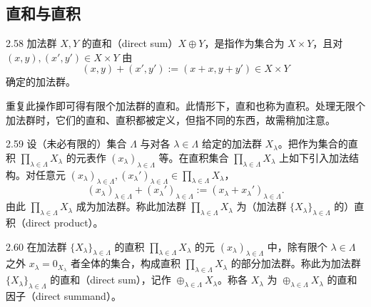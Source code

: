 
\subsection{直和与直积}

\begin{definition}{2.58} 加法群 $X,Y$ 的直和（direct sum）$X\oplus Y$，是指作为集合为 $X\times Y$，且对 $(x,y),(x',y')\in X\times Y$ 由
\[
  (x,y)+(x',y'):=(x+x,y+y')\in X\times Y
\]
确定的加法群。\end{definition}


重复此操作即可得有限个加法群的直和。此情形下，直和也称为直积。处理无限个加法群时，它们的直和、直积都被定义，但指不同的东西，故需稍加注意。

\begin{definition}{2.59} 设（未必有限的）集合 $\Lambda$ 与对各 $\lambda\in\Lambda$ 给定的加法群 $X_\lambda$。把作为集合的直积 $\prod_{\lambda\in\Lambda}X_\lambda$ 的元表作 $(x_\lambda)_{\lambda\in\Lambda}$ 等。在直积集合 $\prod_{\lambda\in\Lambda}X_\lambda$ 上如下引入加法结构。对任意元 $(x_\lambda)_{\lambda\in\Lambda},(x_\lambda')_{\lambda\in\Lambda}\in\prod_{\lambda\in\Lambda}X_\lambda$，
\begin{equation}
  (x_\lambda)_{\lambda\in\Lambda}+(x_\lambda')_{\lambda\in\Lambda}:=(x_\lambda+x_\lambda')_{\lambda\in\Lambda}. \tag{2.7}
\end{equation}
由此 $\prod_{\lambda\in\Lambda}X_\lambda$ 成为加法群。称此加法群 $\prod_{\lambda\in\Lambda}X_\lambda$ 为（加法群 $\{X_\lambda\}_{\lambda\in\Lambda}$ 的）直积（direct product）。\end{definition}

\begin{definition}{2.60} 在加法群 $\{X_\lambda\}_{\lambda\in\Lambda}$ 的直积 $\prod_{\lambda\in\Lambda}X_\lambda$ 的元 $(x_\lambda)_{\lambda\in\Lambda}$ 中，除有限个 $\lambda\in\Lambda$ 之外 $x_\lambda=0_{X_\lambda}$ 者全体的集合，构成直积 $\prod_{\lambda\in\Lambda}X_\lambda$ 的部分加法群。称此为加法群 $\{X_\lambda\}_{\lambda\in\Lambda}$ 的直和（direct sum），记作 $\oplus_{\lambda\in\Lambda}X_\lambda$。称各 $X_\lambda$ 为 $\oplus_{\lambda\in\Lambda}X_\lambda$ 的直和因子（direct summand）。\end{definition}

